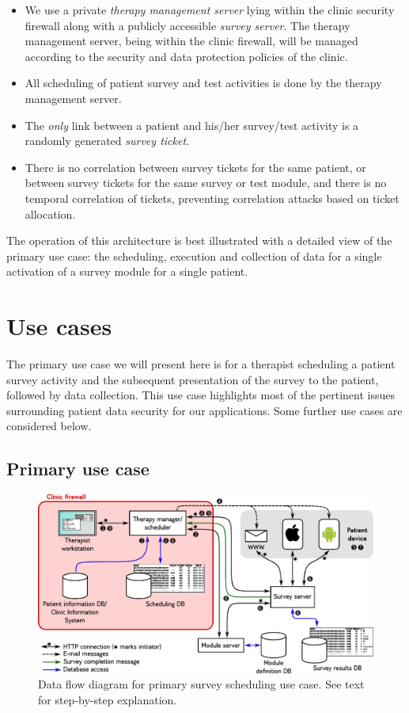 \documentclass[DIV=calc,paper=a4,fontsize=11pt,twocolumn]{scrartcl}
\begin{document}
\begin{itemize}
  \item{We use a private \emph{therapy management server} lying within
    the clinic security firewall along with a publicly accessible
    \emph{survey server}.  The therapy management server, being within
    the clinic firewall, will be managed according to the security and
    data protection policies of the clinic.}
  \item{All scheduling of patient survey and test activities is done
    by the therapy management server.}
  \item{The \emph{only} link between a patient and his/her survey/test
    activity is a randomly generated \emph{survey ticket}.}
  \item{There is no correlation between survey tickets for the same
    patient, or between survey tickets for the same survey or test
    module, and there is no temporal correlation of tickets,
    preventing correlation attacks based on ticket allocation.}
\end{itemize}

The operation of this architecture is best illustrated with a detailed
view of the primary use case: the scheduling, execution and collection
of data for a single activation of a survey module for a single
patient.


\section*{Use cases}

The primary use case we will present here is for a therapist
scheduling a patient survey activity and the subsequent presentation
of the survey to the patient, followed by data collection.  This use
case highlights most of the pertinent issues surrounding patient data
security for our applications.  Some further use cases are considered
below.

\subsection*{Primary use case}

\begin{figure}
  \begin{center}
    \includegraphics[width=\textwidth]{flow-diagram}
  \end{center}
  \caption{Data flow diagram for primary survey scheduling use case.
    See text for step-by-step explanation.}
  \label{fig:flow-diagram}
\end{figure}
\end{document}
